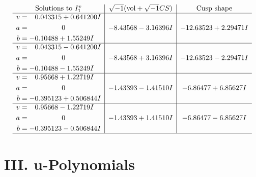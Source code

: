 \documentclass[1p]{elsarticle_modified}
\theoremstyle{definition}
\newcommand{\I}{\sqrt{-1}}
\begin{document}
$$\begin{array}{c|c|c}  
\text{Solutions to }I^v_{1}& \I (\text{vol} + \sqrt{-1}CS) & \text{Cusp shape}\\
 \hline 
\begin{aligned}
v &= \phantom{-}0.043315 + 0.641200 I \\
a &= \phantom{-0.000000 } 0 \\
b &= -0.10488 + 1.55249 I\end{aligned}
 & -8.43568 - 3.16396 I & -12.63523 + 2.29471 I \\ \hline\begin{aligned}
v &= \phantom{-}0.043315 - 0.641200 I \\
a &= \phantom{-0.000000 } 0 \\
b &= -0.10488 - 1.55249 I\end{aligned}
 & -8.43568 + 3.16396 I & -12.63523 - 2.29471 I \\ \hline\begin{aligned}
v &= \phantom{-}0.95668 + 1.22719 I \\
a &= \phantom{-0.000000 } 0 \\
b &= -0.395123 + 0.506844 I\end{aligned}
 & -1.43393 - 1.41510 I & -6.86477 + 6.85627 I \\ \hline\begin{aligned}
v &= \phantom{-}0.95668 - 1.22719 I \\
a &= \phantom{-0.000000 } 0 \\
b &= -0.395123 - 0.506844 I\end{aligned}
 & -1.43393 + 1.41510 I & -6.86477 - 6.85627 I\\
 \hline 
 \end{array}$$\newpage
\newpage\renewcommand{\arraystretch}{1}
\centering \section*{ III. u-Polynomials}
\end{document}
